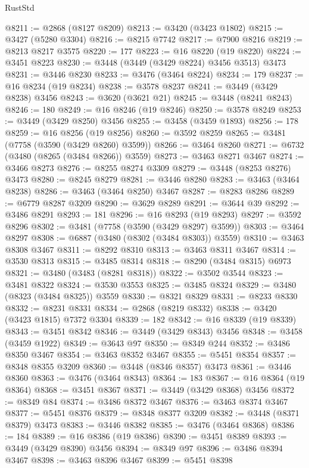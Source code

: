 \begin{lexlean}{RustStd}
\begin{coremodule}
{\begin{coremodule}
{{{{{{{{{{{{{{{{{{{{{{{{{{{{{{{{{{{{{{{{{{{{{{{{{{{{{{{{{{{{{{{{{{{{{{{{{{{{{{{{{{{{{@8211 := @2868 (@8127 @8209)
@8213 := @3420 (@3423 @1802)
@8215 := @3427 (@5280 @3304)
@8216 := @8215 @7742
@8217 := @7900 @8216
@8219 := @8213 @8217 @3575
@8220 := 177
@8223 := @16 @8220 (@19 @8220)
@8224 := @3451 @8223
@8230 := @3448 (@3449 (@3429 @8224) @3456 @3513) @3473
@8231 := @3446 @8230
@8233 := @3476 (@3464 @8224)
@8234 := 179
@8237 := @16 @8234 (@19 @8234)
@8238 := @3578 @8237
@8241 := @3449 (@3429 @8238) @3456
@8243 := @3620 (@3621 @21)
@8245 := @3448 (@8241 @8243)
@8246 := 180
@8249 := @16 @8246 (@19 @8246)
@8250 := @3578 @8249
@8253 := @3449 (@3429 @8250) @3456
@8255 := @3458 (@3459 @1893)
@8256 := 178
@8259 := @16 @8256 (@19 @8256)
@8260 := @3592 @8259
@8265 := @3481 (@7758 (@3590 (@3429 @8260) @3599))
@8266 := @3464 @8260
@8271 := @6732 (@3480 (@8265 (@3484 @8266)) @3559)
@8273 := @3463 @8271 @3467
@8274 := @3466 @8273
@8276 := @8255 @8274 @3309
@8279 := @3448 (@8253 @8276) @3473
@8280 := @8245 @8279
@8281 := @3446 @8280
@8283 := @3463 (@3464 @8238)
@8286 := @3463 (@3464 @8250) @3467
@8287 := @8283 @8286
@8289 := @6779 @8287 @3209
@8290 := @3629 @8289
@8291 := @3644 @39
@8292 := @3486 @8291
@8293 := 181
@8296 := @16 @8293 (@19 @8293)
@8297 := @3592 @8296
@8302 := @3481 (@7758 (@3590 (@3429 @8297) @3599))
@8303 := @3464 @8297
@8308 := @6887 (@3480 (@8302 (@3484 @8303)) @3559)
@8310 := @3463 @8308 @3467
@8311 := @8292 @8310
@8313 := @3463 @8311 @3467
@8314 := @3530 @8313
@8315 := @3485 @8314
@8318 := @8290 (@3484 @8315) @6973
@8321 := @3480 (@3483 (@8281 @8318))
@8322 := @3502 @3544
@8323 := @3481 @8322
@8324 := @3530 @3553
@8325 := @3485 @8324
@8329 := @3480 (@8323 (@3484 @8325)) @3559
@8330 := @8321 @8329
@8331 := @8233 @8330
@8332 := @8231 @8331
@8334 := @2868 (@8219 @8332)
@8338 := @3420 (@3423 @1815) @7372 @3304
@8339 := 182
@8342 := @16 @8339 (@19 @8339)
@8343 := @3451 @8342
@8346 := @3449 (@3429 @8343) @3456
@8348 := @3458 (@3459 @1922)
@8349 := @3643 @97
@8350 := @8349 @244
@8352 := @3486 @8350 @3467
@8354 := @3463 @8352 @3467
@8355 := @5451 @8354
@8357 := @8348 @8355 @3209
@8360 := @3448 (@8346 @8357) @3473
@8361 := @3446 @8360
@8363 := @3476 (@3464 @8343)
@8364 := 183
@8367 := @16 @8364 (@19 @8364)
@8368 := @3451 @8367
@8371 := @3449 (@3429 @8368) @3456
@8372 := @8349 @84
@8374 := @3486 @8372 @3467
@8376 := @3463 @8374 @3467
@8377 := @5451 @8376
@8379 := @8348 @8377 @3209
@8382 := @3448 (@8371 @8379) @3473
@8383 := @3446 @8382
@8385 := @3476 (@3464 @8368)
@8386 := 184
@8389 := @16 @8386 (@19 @8386)
@8390 := @3451 @8389
@8393 := @3449 (@3429 @8390) @3456
@8394 := @8349 @97
@8396 := @3486 @8394 @3467
@8398 := @3463 @8396 @3467
@8399 := @5451 @8398
}}}}}}}}}}}}}}}}}}}}}}}}}}}}}}}}}}}}}}}}}}}}}}}}}}}}}}}}}}}}}}}}}}}}}}}}}}}}}}}}}}}}}
\end{coremodule}}
\end{coremodule}
\end{lexlean}
